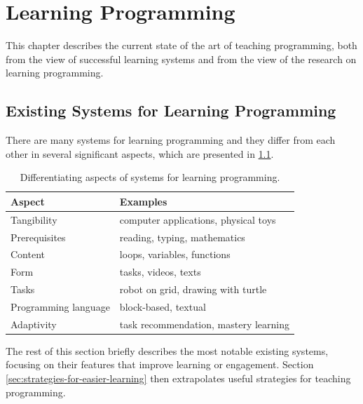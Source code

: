 \chapter{Learning Programming}
\label{chap:learning-programming}

This chapter describes the current state of the art of teaching programming, both from the view of successful learning systems and from the view of the research on learning programming.

\section{Existing Systems for Learning Programming}
\label{sec:existing-systems}

There are many systems for learning programming and they differ from each other
in several significant aspects, which are presented in \cref{tbl:existing-systems-categorization}.

\begin{table}[htb]
\centering
\begin{tabular}{l l}
\toprule
Aspect & Examples \\
\midrule
Tangibility & computer applications, physical toys \\
Prerequisites & reading, typing, mathematics \\
Content & loops, variables, functions \\
Form & tasks, videos, texts \\ %
Tasks & robot on grid, drawing with turtle \\
Programming language & block-based, textual \\
Adaptivity & task recommendation, mastery learning \\
\bottomrule
\end{tabular}
\caption{Differentiating aspects of systems for learning programming.}
\label{tbl:existing-systems-categorization}
\end{table}


The rest of this section briefly describes the most notable existing systems,
focusing on their features that improve learning or engagement.
Section \ref{sec:strategies-for-easier-learning} then extrapolates useful
strategies for teaching programming.


